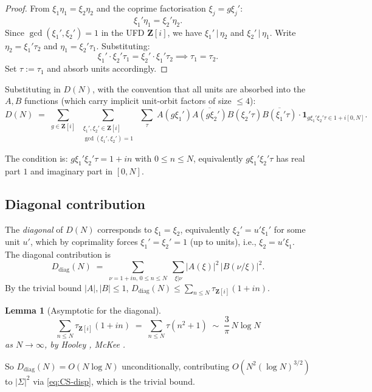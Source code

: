 \documentclass[11pt]{article}
\newtheorem{lemma}[theorem]{Lemma}
\theoremstyle{definition}
\newcommand{\Z}{\mathbf{Z}}
\newcommand{\Zi}{\Z[i]}
\begin{document}
\begin{proof}
From $\xi_1\eta_1=\xi_2\eta_2$ and the coprime factorisation $\xi_j=g\xi_j'$:
\[
\xi_1'\eta_1=\xi_2'\eta_2.
\]
Since $\gcd(\xi_1',\xi_2')=1$ in the UFD $\Zi$, we have $\xi_1'\,|\,\eta_2$ and $\xi_2'\,|\,\eta_1$. Write $\eta_2=\xi_1'\tau_2$ and $\eta_1=\xi_2'\tau_1$. Substituting:
\[
\xi_1'\cdot\xi_2'\tau_1=\xi_2'\cdot\xi_1'\tau_2\implies\tau_1=\tau_2.
\]
Set $\tau:=\tau_1$ and absorb units accordingly.
\end{proof}

Substituting in $D(N)$, with the convention that all units are absorbed into the $A,B$ functions (which carry implicit unit-orbit factors of size $\le 4$):
\begin{equation}\label{eq:D-after-gcd}
D(N)\;=\;\sum_{g\in\Zi}\;\sum_{\substack{\xi_1',\xi_2'\in\Zi\\\gcd(\xi_1',\xi_2')=1}}\;\sum_\tau\;A(g\xi_1')\overline{A(g\xi_2')}B(\xi_2'\tau)\overline{B(\xi_1'\tau)}\cdot\mathbf{1}_{g\xi_1'\xi_2'\tau\in 1+i[0,N]}.
\end{equation}

The condition is: $g\xi_1'\xi_2'\tau=1+in$ with $0\le n\le N$, equivalently $g\xi_1'\xi_2'\tau$ has real part $1$ and imaginary part in $[0,N]$.

\subsection{Diagonal contribution}

The \emph{diagonal} of $D(N)$ corresponds to $\xi_1=\xi_2$, equivalently $\xi_2'=u'\xi_1'$ for some unit $u'$, which by coprimality forces $\xi_1'=\xi_2'=1$ (up to units), i.e., $\xi_2=u'\xi_1$. The diagonal contribution is
\begin{equation}\label{eq:diag}
D_{\mathrm{diag}}(N)\;=\;\sum_{\nu=1+in,\,0\le n\le N}\;\sum_{\xi|\nu}|A(\xi)|^2\,|B(\nu/\xi)|^2.
\end{equation}
By the trivial bound $|A|,|B|\le 1$, $D_{\mathrm{diag}}(N)\le\sum_{n\le N}\tau_{\Zi}(1+in)$.

\begin{lemma}[Asymptotic for the diagonal]\label{lem:diag-asymp}
\[
\sum_{n\le N}\tau_{\Zi}(1+in)\;=\;\sum_{n\le N}\tau(n^2+1)\;\sim\;\frac{3}{\pi}\,N\log N
\]
as $N\to\infty$, by Hooley \cite{hooley63}, McKee \cite{mckee99}.
\end{lemma}

So $D_{\mathrm{diag}}(N)=O(N\log N)$ unconditionally, contributing $O(N^2(\log N)^{3/2})$ to $|\Sigma|^2$ via \eqref{eq:CS-disp}, which is the trivial bound.
\end{document}
